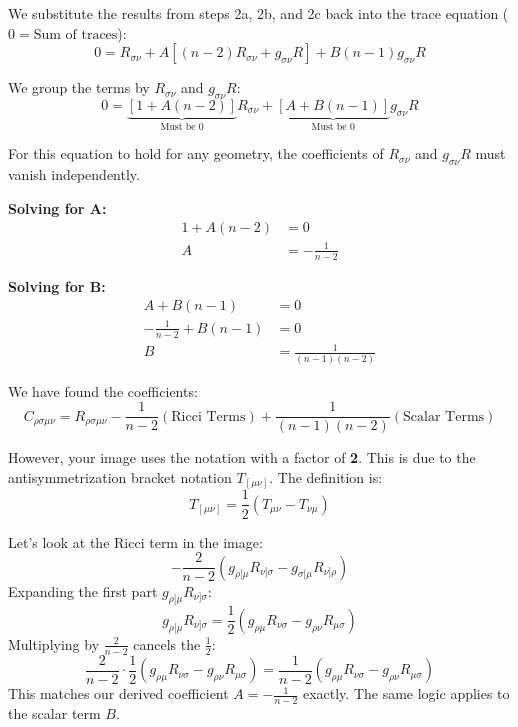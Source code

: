 \documentclass[11pt, a4paper]{report}
\begin{document}
We substitute the results from steps 2a, 2b, and 2c back into the trace equation ($0 = \text{Sum of traces}$):
\begin{equation}
    0 = R_{\sigma\nu} + A [ (n-2) R_{\sigma\nu} + g_{\sigma\nu} R ] + B (n-1) g_{\sigma\nu} R
\end{equation}

We group the terms by $R_{\sigma\nu}$ and $g_{\sigma\nu} R$:
\begin{equation}
    0 = \underbrace{[ 1 + A(n-2) ]}_{\text{Must be 0}} R_{\sigma\nu} + \underbrace{[ A + B(n-1) ]}_{\text{Must be 0}} g_{\sigma\nu} R
\end{equation}

For this equation to hold for any geometry, the coefficients of $R_{\sigma\nu}$ and $g_{\sigma\nu} R$ must vanish independently.

\textbf{Solving for A:}
\begin{align*}
    1 + A(n-2) &= 0 \\
    A &= -\frac{1}{n-2}
\end{align*}

\textbf{Solving for B:}
\begin{align*}
    A + B(n-1) &= 0 \\
    -\frac{1}{n-2} + B(n-1) &= 0 \\
    B &= \frac{1}{(n-1)(n-2)}
\end{align*}

We have found the coefficients:
\begin{equation*}
    C_{\rho\sigma\mu\nu} = R_{\rho\sigma\mu\nu} - \frac{1}{n-2}(\text{Ricci Terms}) + \frac{1}{(n-1)(n-2)}(\text{Scalar Terms})
\end{equation*}

However, your image uses the notation with a factor of \textbf{2}. This is due to the antisymmetrization bracket notation $T_{[\mu\nu]}$.
The definition is:
\begin{equation}
    T_{[\mu\nu]} = \frac{1}{2} (T_{\mu\nu} - T_{\nu\mu})
\end{equation}

Let's look at the Ricci term in the image:
\begin{equation}
    - \frac{2}{n-2} (g_{\rho[\mu} R_{\nu]\sigma} - g_{\sigma[\mu} R_{\nu]\rho})
\end{equation}
Expanding the first part $g_{\rho[\mu} R_{\nu]\sigma}$:
\begin{equation}
    g_{\rho[\mu} R_{\nu]\sigma} = \frac{1}{2} (g_{\rho\mu} R_{\nu\sigma} - g_{\rho\nu} R_{\mu\sigma})
\end{equation}
Multiplying by $\frac{2}{n-2}$ cancels the $\frac{1}{2}$:
\begin{equation}
    \frac{2}{n-2} \cdot \frac{1}{2} (g_{\rho\mu} R_{\nu\sigma} - g_{\rho\nu} R_{\mu\sigma}) = \frac{1}{n-2} (g_{\rho\mu} R_{\nu\sigma} - g_{\rho\nu} R_{\mu\sigma})
\end{equation}
This matches our derived coefficient $A = -\frac{1}{n-2}$ exactly. The same logic applies to the scalar term $B$.
\end{document}
